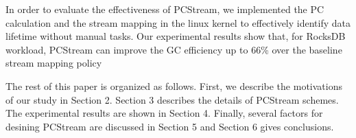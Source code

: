 In order to evaluate the effectiveness of PCStream, 
we implemented the PC calculation and the stream mapping in the linux kernel to
effectively identify data lifetime without manual tasks.
Our experimental results show that, for RocksDB workload, PCStream can improve 
the GC efficiency up to 66\% over the baseline stream mapping policy 

The rest of this paper is organized as follows. First, we describe the motivations of our study in Section 2.
Section 3 describes the details of PCStream schemes. The experimental results are shown in Section 4. 
Finally, several factors for desining PCStream are discussed in Section 5 and Section 6 gives conclusions.

\begin{comment}
...
Recent studies have used two strategies to utilize the stream feature.
One is to classify the application data into different streams based on an understanding
of the expected lifetime of those data~\cite{MultiStream},~\cite{FStream}. 
This manual stream assignment requires the programmer or system manager to 
fully understand the lifetime characteristics of the data, such as different levels
of a log-structured merge tree or the file extension of commitlog file.
Also when multiple applications try to assign streams, a centralized stream assignment
is required to avoid conflicts.
The other is to automate the process of mapping write I/O operations to an SSD stream~\cite{AutoStream}.
However, since AutoStream relies on the past LBA access patterns, 
it is not practical when the data are written in append-only manner, e.g. RocksDB or Cassandra.

Usually, the lifetime of data is determined by its purpose.
For example, files such as the write ahead log in RocksDB are quickly deleted, 
while write-once data is kept at the bottom level of the LSM-tree for a long time.
Our approach is motivated by the observation that the purpose of the application can be defined as
the execution path of function calls that lead to a write system call, called program context.
In this paper, we take the program context information as a lifetime hint for the automatic stream allocation. 
\end{comment}

